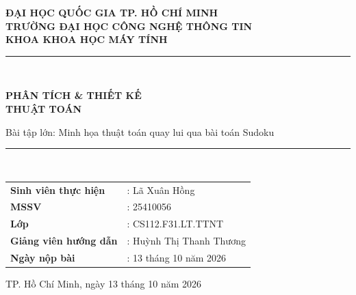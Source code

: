 \documentclass[12pt, a4paper]{report}
\newcommand{\hoten}{Lã Xuân Hồng}
\newcommand{\mssv}{25410056}
\newcommand{\lophoc}{CS112.F31.LT.TTNT}
\newcommand{\giangvien}{Huỳnh Thị Thanh Thương}
\newcommand{\ngaynop}{13 tháng 10 năm 2026}
\newcommand{\tenbaitap}{Bài tập lớn: Minh họa thuật toán quay lui qua bài toán Sudoku}
\begin{document}
\begin{titlepage}
  \centering
  {\large\bfseries ĐẠI HỌC QUỐC GIA TP. HỒ CHÍ MINH \\
   TRƯỜNG ĐẠI HỌC CÔNG NGHỆ THÔNG TIN \\
   KHOA KHOA HỌC MÁY TÍNH \par}

  \vspace{2.5cm}
  \rule{\linewidth}{0.5pt}\\[0.5cm]
  {\Huge\bfseries PHÂN TÍCH \& THIẾT KẾ \\[0.3cm] THUẬT TOÁN \par}
  \vspace{0.4cm}
  {\Large \tenbaitap \par}
  \rule{\linewidth}{0.5pt}\\[2cm]

  \begin{tabular}{@{}ll@{}}
    \textbf{Sinh viên thực hiện} & : \hoten \\[4pt]
    \textbf{MSSV}                & : \mssv \\[4pt]
    \textbf{Lớp}                 & : \lophoc \\[4pt]
    \textbf{Giảng viên hướng dẫn}& : \giangvien \\[4pt]
    \textbf{Ngày nộp bài}        & : \ngaynop \\
  \end{tabular}

  \vfill
  {\large TP. Hồ Chí Minh, ngày \ngaynop \par}
\end{titlepage}

\tableofcontents










\appendix

\end{document}
